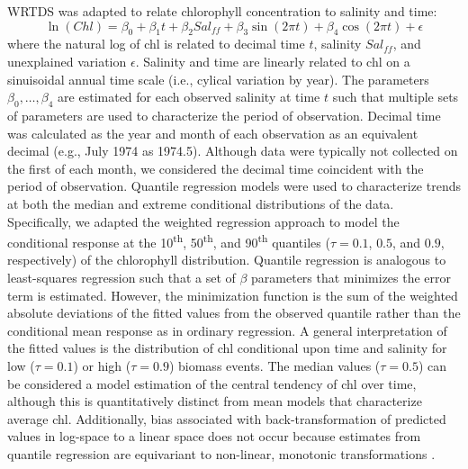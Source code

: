 \documentclass{svjour3}\usepackage[]{graphicx}\usepackage[]{color}
\begin{document}
\ac{WRTDS} was adapted to relate chlorophyll concentration to salinity and time:
\begin{equation}\label{eqn:funform}
\ln\left(Chl\right) = \beta_0 + \beta_1 t + \beta_2 Sal_{ff} + \beta_3 \sin\left(2\pi t\right) + \beta_4 \cos\left(2\pi t\right) + \epsilon
\end{equation}
\noindent where the natural log of \ac{chl} is related to decimal time $t$, salinity $Sal_{ff}$, and unexplained variation $\epsilon$.  Salinity and time are linearly related to \ac{chl} on a sinuisoidal annual time scale (i.e., cylical variation by year). The parameters $\beta_0,\ldots,\beta_4$ are estimated for each observed salinity at time $t$ such that multiple sets of parameters are used to characterize the period of observation.  Decimal time was calculated as the year and month of each observation as an equivalent decimal (e.g., July 1974 as 1974.5).  Although data were typically not collected on the first of each month, we considered the decimal time coincident with the period of observation.  Quantile regression models \cite{Cade03} were used to characterize trends at both the median and extreme conditional distributions of the data.  Specifically, we adapted the weighted regression approach to model the conditional response at the 10\textsuperscript{th}, 50\textsuperscript{th}, and 90\textsuperscript{th} quantiles ($\tau=0.1$, $0.5$, and $0.9$, respectively) of the chlorophyll distribution. Quantile regression is analogous to least-squares regression such that a set of $\beta$ parameters that minimizes the error term is estimated.  However, the minimization function is the sum of the weighted absolute deviations of the fitted values from the observed quantile rather than the conditional mean response as in ordinary regression.  A general interpretation of the fitted values is the distribution of \ac{chl} conditional upon time and salinity for low ($\tau=0.1$) or high ($\tau=0.9$) biomass events.  The median values ($\tau=0.5$) can be considered a model estimation of the central tendency of \ac{chl} over time, although this is quantitatively distinct from mean models that characterize average \ac{chl}.  Additionally, bias associated with back-transformation of predicted values in log-space to a linear space does not occur because estimates from quantile regression are equivariant to non-linear, monotonic transformations \cite{Koenker08}. 
\end{document}
